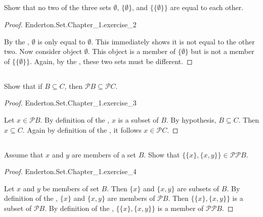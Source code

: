\documentclass{report}
\begin{document}
\subsection{}%
\label{sub:baby-set-theory-2}

Show that no two of the three sets $\emptyset$, $\{\emptyset\}$, and
  $\{\{\emptyset\}\}$ are equal to each other.

\begin{proof}

    {Enderton.Set.Chapter\_1.exercise\_2}

  By the , $\emptyset$ is only equal to
    $\emptyset$.
  This immediately shows it is not equal to the other two.
  Now consider object $\emptyset$.
  This object is a member of $\{\emptyset\}$ but is not a member of
    $\{\{\emptyset\}\}$.
  Again, by the , these two sets must be
    different.

\end{proof}

\subsection{}%
\label{sub:baby-set-theory-3}

Show that if $B \subseteq C$, then $\mathscr{P} B \subseteq \mathscr{P} C$.

\begin{proof}

    {Enderton.Set.Chapter\_1.exercise\_3}

  Let $x \in \mathscr{P} B$.
  By definition of the , $x$ is a subset of $B$.
  By hypothesis, $B \subseteq C$.
  Then $x \subseteq C$.
  Again by definition of the , it follows
    $x \in \mathscr{P} C$.

\end{proof}

\subsection{}%
\label{sub:baby-set-theory-4}

Assume that $x$ and $y$ are members of a set $B$.
Show that $\{\{x\}, \{x, y\}\} \in \mathscr{P}\mathscr{P} B.$

\begin{proof}

    {Enderton.Set.Chapter\_1.exercise\_4}

  Let $x$ and $y$ be members of set $B$.
  Then $\{x\}$ and $\{x, y\}$ are subsets of $B$.
  By definition of the , $\{x\}$ and $\{x, y\}$ are
    members of $\mathscr{P} B$.
  Then $\{\{x\}, \{x, y\}\}$ is a subset of $\mathscr{P} B$.
  By definition of the , $\{\{x\}, \{x, y\}\}$ is a member
    of $\mathscr{P}\mathscr{P} B$.

\end{proof}
\end{document}
